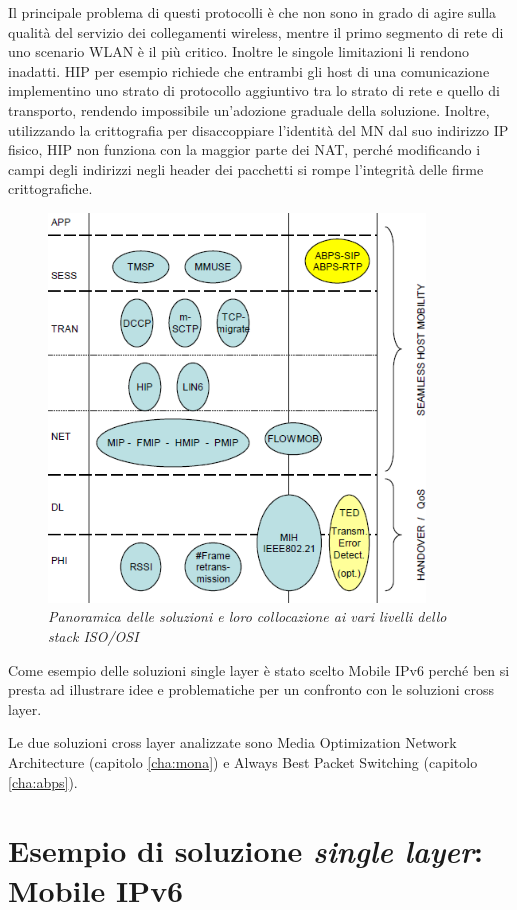 \documentclass[12pt,a4paper,openright,twoside]{book}
\begin{document}
Il principale problema di questi protocolli è che non sono in grado di
agire sulla qualità del servizio dei collegamenti wireless, mentre il
primo segmento di rete di uno scenario WLAN è il più critico. Inoltre
le singole limitazioni li rendono inadatti. HIP per esempio richiede
che entrambi gli host di una comunicazione implementino uno strato di
protocollo aggiuntivo tra lo strato di rete e quello di transporto,
rendendo impossibile un'adozione graduale della soluzione. Inoltre,
utilizzando la crittografia per disaccoppiare l'identità del MN dal
suo indirizzo IP fisico, HIP non funziona con la maggior parte dei
NAT, perché modificando i campi degli indirizzi negli header dei
pacchetti si rompe l'integrità delle firme crittografiche.

\begin{figure}
  \centering
  \includegraphics[width=10cm]{img/panoramica-soluzioni}
  \caption{\em Panoramica delle soluzioni e loro collocazione ai vari
    livelli dello stack ISO/OSI}
  \label{fig:panoramica}
\end{figure}

Come esempio delle soluzioni single layer è stato scelto Mobile IPv6
perché ben si presta ad illustrare idee e problematiche per un
confronto con le soluzioni cross layer.

Le due soluzioni cross layer analizzate sono Media Optimization
Network Architecture (capitolo \ref{cha:mona}) e Always Best Packet
Switching (capitolo \ref{cha:abps}).

\section{Esempio di soluzione \emph{single layer}: Mobile IPv6}
\end{document}
